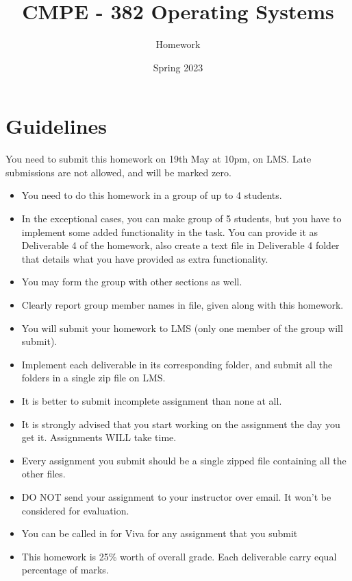 \documentclass[a4paper,12pt]{article}
\begin{document}
	
	\title{CMPE - 382 Operating Systems }
	\author{Homework}
	\date{Spring 2023}
	\maketitle
	\section*{Guidelines}
	
	You need to submit this homework on  {\color{blue}19th May at 10pm}, on LMS. Late submissions are not allowed, and will be marked zero. 

	
	\begin{itemize}
		\item You need to do this homework in a group of up to 4 students. 
		\item In the exceptional cases, you can make group of 5 students, but you have to implement some added functionality in the task. You can provide it as Deliverable 4 of the homework, also create a text file in Deliverable 4 folder that details what you have provided as extra functionality. 
		\item You may form the group with other sections as well. 
		\item Clearly report group member names in  file, given along with this homework. 
		\item You will submit your homework to LMS (only one member of the group will submit).
		\item Implement each deliverable in its corresponding folder, and submit all the folders in a single zip file on LMS.
		\item It is better to submit incomplete assignment than none at all.
		\item It is strongly advised that you start working on the assignment the day you get it. Assignments WILL take time.
		\item Every assignment you submit should be a single zipped file containing all the other files. 
		\item DO NOT send your assignment to your instructor over email. It won't be considered for evaluation. 
		\item You can be called in for Viva for any assignment that you submit
		\item This homework is 25\% worth of overall grade. Each deliverable carry equal percentage of marks.
	\end{itemize}
	
	
	
\end{document}
